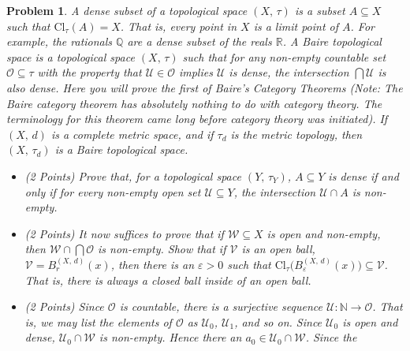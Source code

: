 \documentclass{article}
\theoremstyle{normal}
\newtheorem{problem}{Problem}
\begin{document}
    \clearpage
    \color{blue}
    \begin{problem}
        A dense subset of a topological space $(X,\,\tau)$ is a subset
        $A\subseteq{X}$ such that $\textrm{Cl}_{\tau}(A)=X$. That is, every
        point in $X$ is a limit point of $A$. For example, the rationals
        $\mathbb{Q}$ are a dense subset of the reals $\mathbb{R}$.
        A Baire topological space is a topological space $(X,\,\tau)$ such that
        for any non-empty countable set $\mathcal{O}\subseteq\tau$ with the
        property that $\mathcal{U}\in\mathcal{O}$ implies $\mathcal{U}$ is
        dense, the intersection $\bigcap\mathcal{U}$ is also dense. Here you
        will prove the first of Baire's Category Theorems (Note: The Baire
        category theorem has absolutely nothing to do with category theory.
        The terminology for this theorem came long before category theory was
        initiated). If $(X,\,d)$ is a complete metric space, and if
        $\tau_{d}$ is the metric topology, then $(X,\,\tau_{d})$ is a Baire
        topological space.
        \begin{itemize}
            \item (2 Points) Prove that, for a topological space
                $(Y,\,\tau_{Y})$, $A\subseteq{Y}$ is dense if and only if
                for every non-empty open set $\mathcal{U}\subseteq{Y}$, the
                intersection $\mathcal{U}\cap{A}$ is non-empty.
            \item (2 Points) It now suffices to prove that if
                $\mathcal{W}\subseteq{X}$ is open and non-empty, then
                $\mathcal{W}\cap\bigcap\mathcal{O}$ is non-empty. Show that if
                $\mathcal{V}$ is an open ball,
                $\mathcal{V}=B_{r}^{(X,\,d)}(x)$, then there is an
                $\varepsilon>0$ such that
                $\textrm{Cl}_{\tau}\big(B_{\varepsilon}^{(X,\,d)}(x)\big)\subseteq\mathcal{V}$.
                That is, there is always a \textit{closed ball} inside of an
                open ball.
            \item (2 Points) Since $\mathcal{O}$ is countable, there is a
                surjective sequence
                $\mathcal{U}:\mathbb{N}\rightarrow\mathcal{O}$. That
                is, we may list the elements of $\mathcal{O}$ as $\mathcal{U}_{0}$,
                $\mathcal{U}_{1}$, and so on. Since $\mathcal{U}_{0}$ is open
                and dense, $\mathcal{U}_{0}\cap\mathcal{W}$ is non-empty. Hence
                there an $a_{0}\in\mathcal{U}_{0}\cap\mathcal{W}$. Since the

\end{itemize}
\end{problem}
\end{document}

